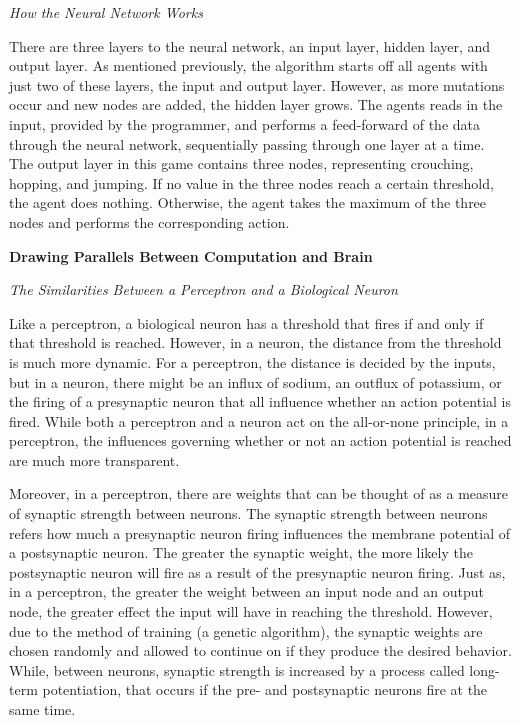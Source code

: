 \documentclass[12pt]{article}
\begin{document}
\begin{flushleft}
\hfill

\noindent\emph{How the Neural Network Works}

There are three layers to the neural network, an input layer, hidden layer, and output layer. As mentioned previously, the algorithm starts off all agents with just two of these layers, the input and output layer. However, as more mutations occur and new nodes are added, the hidden layer grows. The agents reads in the input, provided by the programmer, and performs a feed-forward of the data through the neural network, sequentially passing through one layer at a time. The output layer in this game contains three nodes, representing crouching, hopping, and jumping. If no value in the three nodes reach a certain threshold, the agent does nothing. Otherwise, the agent takes the maximum of the three nodes and performs the corresponding action.

\hfill

\noindent\textbf{Drawing Parallels Between Computation and Brain}

\noindent\emph{The Similarities Between a Perceptron and a Biological Neuron}

Like a perceptron, a biological neuron has a threshold that fires if and only if that threshold is reached. However, in a neuron, the distance from the threshold is much more dynamic. For a perceptron, the distance is decided by the inputs, but in a neuron, there might be an influx of sodium, an outflux of potassium, or the firing of a presynaptic neuron that all influence whether an action potential is fired. While both a perceptron and a neuron act on the all-or-none principle, in a perceptron, the influences governing whether or not an action potential is reached are much more transparent. 

Moreover, in a perceptron, there are weights that can be thought of as a measure of synaptic strength between neurons. The synaptic strength between neurons refers how much a presynaptic neuron firing influences the membrane potential of a postsynaptic neuron. The greater the synaptic weight, the more likely the postsynaptic neuron will fire as a result of the presynaptic neuron firing. Just as, in a perceptron, the greater the weight between an input node and an output node, the greater effect the input will have in reaching the threshold. However, due to the method of training (a genetic algorithm), the synaptic weights are chosen randomly and allowed to continue on if they produce the desired behavior. While, between neurons, synaptic strength is increased by a process called long-term potentiation, that occurs if the pre- and postsynaptic neurons fire at the same time.


\end{flushleft}
\end{document}
